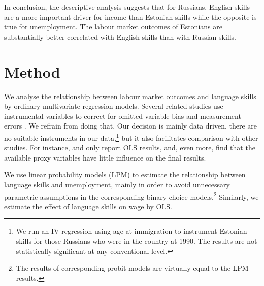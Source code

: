 \documentclass[12pt, a4paper]{article}
\begin{document}
In conclusion, the descriptive analysis suggests that for Russians,
English skills are a more important driver for income than Estonian
skills while the opposite is true for unemployment.  The labour market
outcomes of Estonians are substantially better correlated with English
skills than with Russian skills.



\section{Method}
\label{sec:method}

We analyse the relationship between labour market outcomes and language
skills by ordinary multivariate regression models.
Several related studies use instrumental variables to correct for
omitted variable bias and measurement errors \citep{Chiswick1995, bleakley+chin2004}.
We refrain from doing that. Our decision is mainly data driven,
there are no suitable instruments in our data,\footnote{We run an IV
	regression using age at immigration to instrument Estonian skills
	for those Russians who were in the country at 1990.  The results are
	not statistically significant at any conventional level.} but it also facilitates
comparison with other studies.  For instance,
\citet{azam+2013EDandCC} and \citet{paolo+tansel2015JofDevStud} only
report OLS results, and, even more, find that the available proxy
variables have little influence on the final results.

We use linear probability models (LPM) to estimate the relationship between
language skills and unemployment, mainly in order to avoid unnecessary parametric
assumptions in the corresponding binary choice models.\footnote{The
	results of corresponding probit models are virtually equal to the LPM results.}
Similarly, we estimate the effect of language skills on wage by
OLS. 
\end{document}
